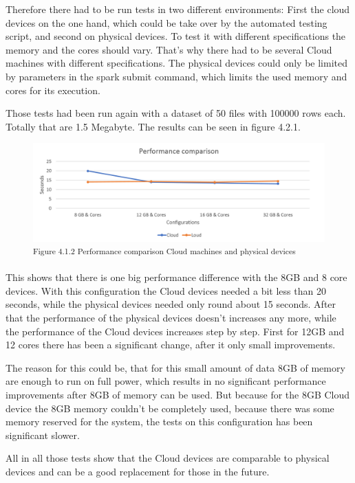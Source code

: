 Therefore there had to be run tests in two different environments: First the cloud devices on the one hand, which could be take over by the automated testing script, and second on physical devices. To test it with different specifications the memory and the cores should vary. That's why there had to be several Cloud machines with different specifications. The physical devices could only be limited by parameters in the spark submit command, which limits the used memory and cores for its execution.

Those tests had been run again with a dataset of 50 files with 100000 rows each. Totally that are 1.5 Megabyte. The results can be seen in figure 4.2.1.

\begin{figure}[h]
\centering
\includegraphics[width=\textwidth/4*3]{images/performance_comparison.png}
\textsuperscript{Figure 4.1.2 Performance comparison Cloud machines and physical devices}
\end{figure}

This shows that there is one big performance difference with the 8GB and 8 core devices. With this configuration the Cloud devices needed a bit less than 20 seconds, while the physical devices needed only round about 15 seconds. After that the performance of the physical devices doesn't increases any more, while the performance of the Cloud devices increases step by step. First for 12GB and 12 cores there has been a significant change, after it only small improvements.

The reason for this could be, that for this small amount of data 8GB of memory are enough to run on full power, which results in no significant performance improvements after 8GB of memory can be used. But because for the 8GB Cloud device the 8GB memory couldn't be completely used, because there was some memory reserved for the system, the tests on this configuration has been significant slower.

All in all those tests show that the Cloud devices are comparable to physical devices and can be a good replacement for those in the future.